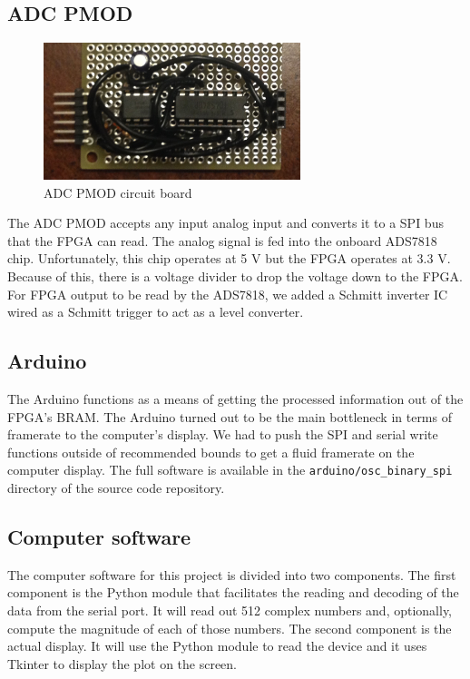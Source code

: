 \documentclass[12pt]{article}
\begin{document}
    \subsection*{ADC PMOD}
      \begin{figure}[H]
        \centering
        \includegraphics[width=75mm]{adc_pmod.JPG}
        \caption{ADC PMOD circuit board}
        \label{overflow}
      \end{figure}
      The ADC PMOD accepts any input analog input and converts it to a SPI bus that the FPGA can read. The analog signal is fed into the onboard ADS7818 chip. Unfortunately, this chip operates at 5 V but the FPGA operates at 3.3 V. Because of this, there is a voltage divider to drop the voltage down to the FPGA. For FPGA output to be read by the ADS7818, we added a Schmitt inverter IC wired as a Schmitt trigger to act as a level converter.

    \subsection*{Arduino}
      The Arduino functions as a means of getting the processed information out of the FPGA's BRAM. The Arduino turned out to be the main bottleneck in terms of framerate to the computer's display. We had to push the SPI and serial write functions outside of recommended bounds to get a fluid framerate on the computer display. The full software is available in the \texttt{arduino/osc\_binary\_spi} directory of the source code repository.

    \subsection*{Computer software}
      The computer software for this project is divided into two components. The first component is the Python module that facilitates the reading and decoding of the data from the serial port. It will read out 512 complex numbers and, optionally, compute the magnitude of each of those numbers. The second component is the actual display. It will use the Python module to read the device and it uses Tkinter to display the plot on the screen.
\end{document}
